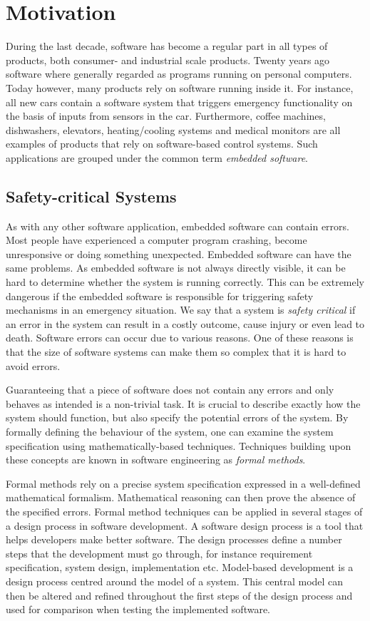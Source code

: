 \chapter{Motivation}
During the last decade, software has become a regular part in all types of products, both consumer- and industrial scale products. Twenty years ago software where generally regarded as programs running on personal computers. Today however, many products rely on software running inside it. For instance, all new cars contain a software system that triggers emergency functionality on the basis of inputs from sensors in the car. Furthermore, coffee machines, dishwashers, elevators, heating/cooling systems and medical monitors are all examples of products that rely on software-based control systems. Such applications are grouped under the common term \emph{embedded software}.

\section{Safety-critical Systems}
As with any other software application, embedded software can contain errors. Most people have experienced a computer program crashing, become unresponsive or doing something unexpected. Embedded software can have the same problems. As embedded software is not always directly visible, it can be hard to determine whether the system is running correctly. This can be extremely dangerous if the embedded software is responsible for triggering safety mechanisms in an emergency situation. We say that a system is \emph{safety critical} if an error in the system can result in a costly outcome, cause injury or even lead to death. Software errors can occur due to various reasons. One of these reasons is that the size of software systems can make them so complex that it is hard to avoid errors.

Guaranteeing that a piece of software does not contain any errors and only behaves as intended is a non-trivial task. It is crucial to describe exactly how the system should function, but also specify the potential errors of the system. By formally defining the behaviour of the system, one can examine the system specification using mathematically-based techniques. Techniques building upon these concepts are known in software engineering as \emph{formal methods}.

Formal methods rely on a precise system specification expressed in a well-defined mathematical formalism. Mathematical reasoning can then prove the absence of the specified errors. Formal method techniques can be applied in several stages of a design process in software development. A software design process is a tool that helps developers make better software. The design processes define a number steps that the development must go through, for instance requirement specification, system design, implementation etc. Model-based development is a design process centred around the model of a system. This central model can then be altered and refined throughout the first steps of the design process and used for comparison when testing the implemented software.

